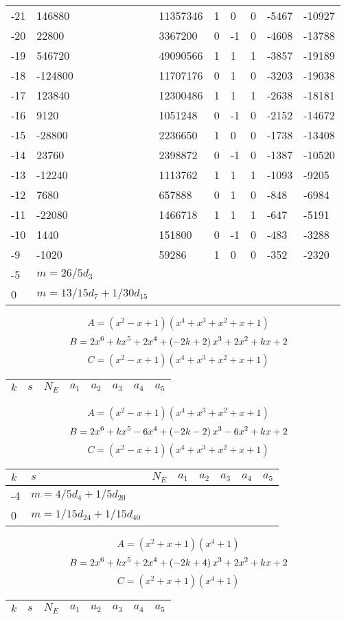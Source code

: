 \documentclass{amsart}
\begin{document}
\begin{longtable}{|l|l|l|lllll|}
-21&146880&11357346&1&0&0&-5467&-10927\\
-20&22800&3367200&0&-1&0&-4608&-13788\\
-19&546720&49090566&1&1&1&-3857&-19189\\
-18&-124800&11707176&0&1&0&-3203&-19038\\
-17&123840&12300486&1&1&1&-2638&-18181\\
-16&9120&1051248&0&-1&0&-2152&-14672\\
-15&-28800&2236650&1&0&0&-1738&-13408\\
-14&23760&2398872&0&-1&0&-1387&-10520\\
-13&-12240&1113762&1&1&1&-1093&-9205\\
-12&7680&657888&0&1&0&-848&-6984\\
-11&-22080&1466718&1&1&1&-647&-5191\\
-10&1440&151800&0&-1&0&-483&-3288\\
-9&-1020&59286&1&0&0&-352&-2320\\
-5&$m=26/5d_{3}$&&\multicolumn{5}{c|}{}\\
0&$m=13/15d_{7}+1/30d_{15}$&&\multicolumn{5}{c|}{}\\
\hline
\end{longtable}
$$A=(x^2
 - x
 + 1)(x^4
 + x^3
 + x^2
 + x
 + 1)$$
$$B=2\*x^6
 + k\*x^5
 + 2\*x^4
 + \left(-2\*k
 + 2\right) \*x^3
 + 2\*x^2
 + k\*x
 + 2$$
$$C=(x^2
 - x
 + 1)(x^4
 + x^3
 + x^2
 + x
 + 1)$$
\begin{longtable}{|l|l|l|lllll|}
\hline
$k$ & $s$ & $N_E$ & $a_1$ & $a_2$ & $a_3$ & $a_4$ & $a_5$\\
\hline
\hline
\end{longtable}
$$A=(x^2
 - x
 + 1)(x^4
 + x^3
 + x^2
 + x
 + 1)$$
$$B=2\*x^6
 + k\*x^5
 - 6\*x^4
 + \left(-2\*k
 - 2\right) \*x^3
 - 6\*x^2
 + k\*x
 + 2$$
$$C=(x^2
 - x
 + 1)(x^4
 + x^3
 + x^2
 + x
 + 1)$$
\begin{longtable}{|l|l|l|lllll|}
\hline
$k$ & $s$ & $N_E$ & $a_1$ & $a_2$ & $a_3$ & $a_4$ & $a_5$\\
\hline
-4&$m=4/5d_{4}+1/5d_{20}$&&\multicolumn{5}{c|}{}\\
0&$m=1/15d_{24}+1/15d_{40}$&&\multicolumn{5}{c|}{}\\
\hline
\end{longtable}
$$A=(x^2
 + x
 + 1)(x^4
 + 1)$$
$$B=2\*x^6
 + k\*x^5
 + 2\*x^4
 + \left(-2\*k
 + 4\right) \*x^3
 + 2\*x^2
 + k\*x
 + 2$$
$$C=(x^2
 + x
 + 1)(x^4
 + 1)$$
\begin{longtable}{|l|l|l|lllll|}
\hline
$k$ & $s$ & $N_E$ & $a_1$ & $a_2$ & $a_3$ & $a_4$ & $a_5$\\
\hline
\hline
\end{longtable}
\end{document}
